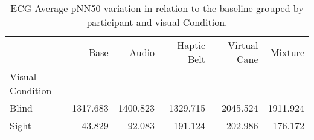 
\begin{table}[!htb]
\centering
\caption{ECG Average pNN50 variation in relation to the baseline grouped by participant and visual Condition.}
\label{tab:ecg_pnn50_variation_group}
\begin{tabular}{lrrrrr}
\toprule
{} &     Base &    Audio &  Haptic Belt &  Virtual Cane &  Mixture \\
Visual Condition &          &          &              &               &          \\
\midrule
Blind            & 1317.683 & 1400.823 &     1329.715 &      2045.524 & 1911.924 \\
Sight            &   43.829 &   92.083 &      191.124 &       202.986 &  176.172 \\
\bottomrule
\end{tabular}
\end{table}

